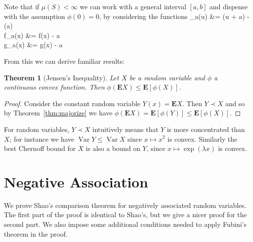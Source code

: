 \documentclass{article}
\newtheorem{theorem}{Theorem}
\newcommand*{\E}[0]{\mathbf{E}}
\DeclareMathOperator*{\Var}{\mathrm{Var}}
\def\[#1\]{\begin{align*}#1\end{align*}}
\begin{document}
Note that if $\mu(S) < \infty$ we can work with a general interval $[a, b]$ and dispense with the assumption $\phi(0) = 0$,
by considering the functions \[\phi_a(u) &= \phi(u + a) - \phi(a) \\ f_a(x) &= f(x) - a \\ g_a(x) &= g(x) - a\]



From this we can derive familiar results:

\begin{theorem}[Jensen's Inequality]
  Let $X$ be a random variable and $\phi$ a continuous convex function. %
  Then $\phi(\E X) \le \E[\phi(X)]$.
\end{theorem}
\begin{proof}
  Consider the constant random variable $Y(x) = \E X$.
  Then $Y \prec X$ and so by Theorem~\ref{thm:majorize} we have
  $\phi(\E X) = \E[\phi(Y)] \le \E[\phi(X)]$.
\end{proof}

For random variables, $Y \prec X$ intuitively means that $Y$ is more concentrated than $X$; for instance we have $\Var Y \le \Var X$ since $x \mapsto x^2$ is convex.  Similarly the best Chernoff bound for $X$ is also a bound on $Y$, since $x \mapsto \exp(\lambda x)$ is convex.


\section*{Negative Association}


We prove Shao's comparison theorem for negatively associated random variables.  The first part of the proof is identical to Shao's, but we give a nicer proof for the second part.  We also impose some additional conditions needed to apply Fubini's theorem in the proof.
\end{document}
